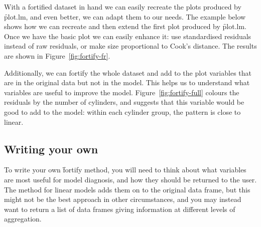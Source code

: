 {With a fortified dataset in hand we can easily recreate the plots produced by \f{plot.lm}, and even better, we can adapt them to our needs. The example below shows how we can recreate and then extend the first plot produced by \f{plot.lm}. Once we have the basic plot we can easily enhance it: use standardised residuals instead of raw residuals, or make size proportional to Cook's distance. The results are shown in Figure~\ref{fig:fortify-fr}.

% 


Additionally, we can fortify the whole dataset and add to the plot variables that are in the original data but not in the model. This helps us to understand what variables are useful to improve the model. Figure~\ref{fig:fortify-full} colours the residuals by the number of cylinders, and suggests that this variable would be good to add to the model: within each cylinder group, the pattern is close to linear.

% 


\subsection{Writing your own}

To write your own \f{fortify} method, you will need to think about what variables are most useful for model diagnosis, and how they should be returned to the user. The method for linear models adds them on to the original data frame, but this might not be the best approach in other circumstances, and you may instead want to return a list of data frames giving information at different levels of aggregation.

}
